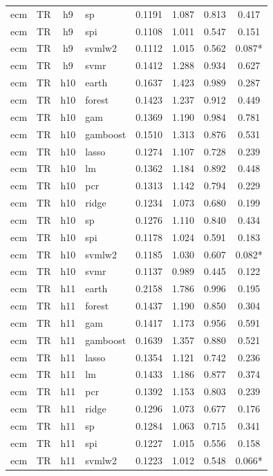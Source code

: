 \begin{ThreePartTable}
\begin{longtable}[t]{llclcccc}
ecm & TR & h9 & sp & 0.1191 & 1.087 & 0.813 & 0.417\\
ecm & TR & h9 & spi & 0.1108 & 1.011 & 0.547 & 0.151\\
ecm & TR & h9 & svmlw2 & 0.1112 & 1.015 & 0.562 & 0.087*\\
ecm & TR & h9 & svmr & 0.1412 & 1.288 & 0.934 & 0.627\\
\addlinespace
ecm & TR & h10 & earth & 0.1637 & 1.423 & 0.989 & 0.287\\
ecm & TR & h10 & forest & 0.1423 & 1.237 & 0.912 & 0.449\\
ecm & TR & h10 & gam & 0.1369 & 1.190 & 0.984 & 0.781\\
ecm & TR & h10 & gamboost & 0.1510 & 1.313 & 0.876 & 0.531\\
ecm & TR & h10 & lasso & 0.1274 & 1.107 & 0.728 & 0.239\\
ecm & TR & h10 & lm & 0.1362 & 1.184 & 0.892 & 0.448\\
ecm & TR & h10 & pcr & 0.1313 & 1.142 & 0.794 & 0.229\\
ecm & TR & h10 & ridge & 0.1234 & 1.073 & 0.680 & 0.199\\
ecm & TR & h10 & sp & 0.1276 & 1.110 & 0.840 & 0.434\\
ecm & TR & h10 & spi & 0.1178 & 1.024 & 0.591 & 0.183\\
ecm & TR & h10 & svmlw2 & 0.1185 & 1.030 & 0.607 & 0.082*\\
ecm & TR & h10 & svmr & 0.1137 & 0.989 & 0.445 & 0.122\\
\addlinespace
ecm & TR & h11 & earth & 0.2158 & 1.786 & 0.996 & 0.195\\
ecm & TR & h11 & forest & 0.1437 & 1.190 & 0.850 & 0.304\\
ecm & TR & h11 & gam & 0.1417 & 1.173 & 0.956 & 0.591\\
ecm & TR & h11 & gamboost & 0.1639 & 1.357 & 0.880 & 0.521\\
ecm & TR & h11 & lasso & 0.1354 & 1.121 & 0.742 & 0.236\\
ecm & TR & h11 & lm & 0.1433 & 1.186 & 0.877 & 0.374\\
ecm & TR & h11 & pcr & 0.1392 & 1.153 & 0.803 & 0.239\\
ecm & TR & h11 & ridge & 0.1296 & 1.073 & 0.677 & 0.176\\
ecm & TR & h11 & sp & 0.1284 & 1.063 & 0.715 & 0.341\\
ecm & TR & h11 & spi & 0.1227 & 1.015 & 0.556 & 0.158\\
ecm & TR & h11 & svmlw2 & 0.1223 & 1.012 & 0.548 & 0.066*\\

\end{longtable}
\end{ThreePartTable}
